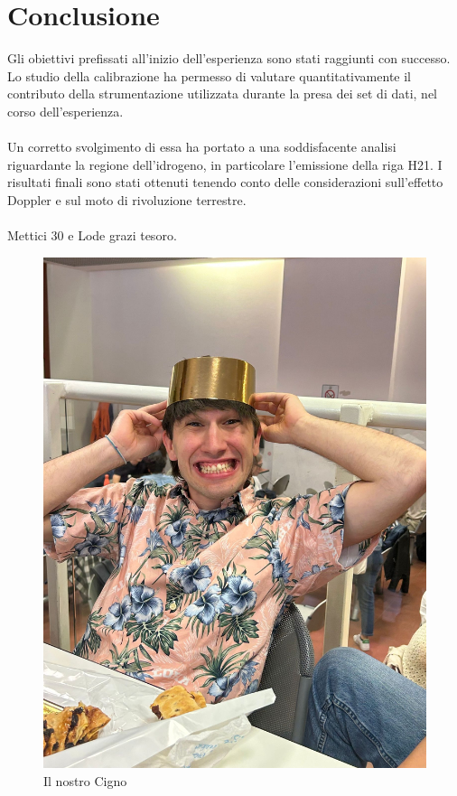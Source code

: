 \section{Conclusione}

Gli obiettivi prefissati all'inizio dell'esperienza sono stati raggiunti con successo. Lo studio della calibrazione ha permesso di valutare quantitativamente il contributo della strumentazione utilizzata durante la presa dei set di dati, nel corso dell'esperienza.
\\\\
Un corretto svolgimento di essa ha portato a una soddisfacente analisi  riguardante la regione dell'idrogeno, in particolare l'emissione della riga H21.
I risultati finali sono stati ottenuti tenendo conto delle considerazioni sull'effetto Doppler e sul moto di rivoluzione terrestre.
\\\\
Mettici 30 e Lode grazi tesoro.

\begin{figure}[H]
	\centering
	\includegraphics[scale=0.1]{Mapp_cigno_2.jpeg}
	\caption{Il nostro Cigno}
    	\label{fig:Mappa_finale}
\end{figure}
